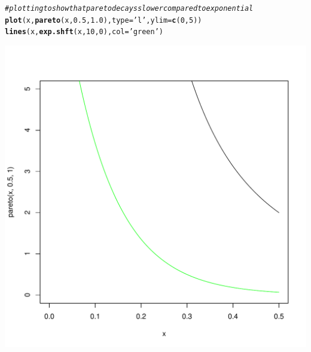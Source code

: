 \documentclass{article}\usepackage[]{graphicx}\usepackage[]{color}
\makeatletter
\def\maxwidth{ %
  \ifdim\Gin@nat@width>\linewidth
    \linewidth
  \else
    \Gin@nat@width
  \fi
}
\newcommand{\hlnum}[1]{\textcolor[rgb]{0.686,0.059,0.569}{#1}}%
\newcommand{\hlstr}[1]{\textcolor[rgb]{0.192,0.494,0.8}{#1}}%
\newcommand{\hlcom}[1]{\textcolor[rgb]{0.678,0.584,0.686}{\textit{#1}}}%
\newcommand{\hlstd}[1]{\textcolor[rgb]{0.345,0.345,0.345}{#1}}%
\newcommand{\hlkwc}[1]{\textcolor[rgb]{0.333,0.667,0.333}{#1}}%
\newcommand{\hlkwd}[1]{\textcolor[rgb]{0.737,0.353,0.396}{\textbf{#1}}}%
\newenvironment{kframe}{%
 \def\at@end@of@kframe{}%
 \ifinner\ifhmode%
  \def\at@end@of@kframe{\end{minipage}}%
  \begin{minipage}{\columnwidth}%
 \fi\fi%
 \def\FrameCommand##1{\hskip\@totalleftmargin \hskip-\fboxsep
 \colorbox{shadecolor}{##1}\hskip-\fboxsep
     \hskip-\linewidth \hskip-\@totalleftmargin \hskip\columnwidth}%
 \MakeFramed {\advance\hsize-\width
   \@totalleftmargin\z@ \linewidth\hsize
   \@setminipage}}%
 {\par\unskip\endMakeFramed%
 \at@end@of@kframe}
\newenvironment{knitrout}{}{} %
\makeatother
\begin{document}
\begin{knitrout}
\begin{kframe}
\begin{alltt}
\hlcom{#plotting to show that pareto decays slower compared to exponential}
\hlkwd{plot}\hlstd{(x,} \hlkwd{pareto}\hlstd{(x,} \hlnum{0.5}\hlstd{,} \hlnum{1.0}\hlstd{),} \hlkwc{type}\hlstd{=}\hlstr{'l'}\hlstd{,}\hlkwc{ylim}\hlstd{=}\hlkwd{c}\hlstd{(}\hlnum{0}\hlstd{,}\hlnum{5}\hlstd{))}
\hlkwd{lines}\hlstd{(x,} \hlkwd{exp.shft}\hlstd{(x,} \hlnum{10}\hlstd{,} \hlnum{0}\hlstd{),} \hlkwc{col}\hlstd{=}\hlstr{'green'}\hlstd{)}
\end{alltt}
\end{kframe}
\includegraphics[width=\maxwidth]{figure/unnamed-chunk-1-1} 

\end{knitrout}
\end{document}
